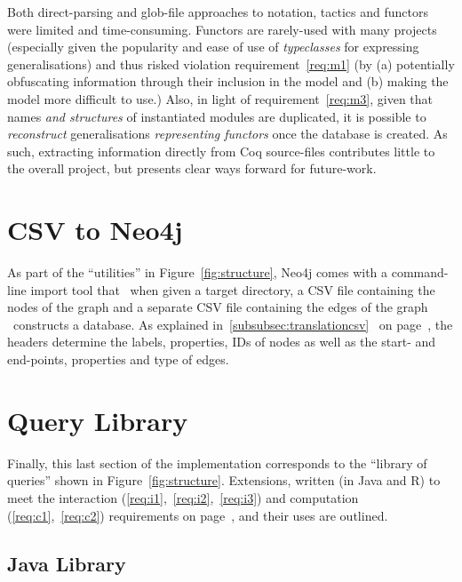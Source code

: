 Both direct-parsing and glob-file approaches to notation, tactics and functors
were limited and time-consuming. Functors are rarely-used with many projects
(especially given the popularity and ease of use of \emph{typeclasses} for
expressing generalisations) and thus risked violation requirement~\ref{req:m1}
(by (a) potentially obfuscating information through their inclusion in the model
and (b) making the model more difficult to use.) Also, in light of
requirement~\ref{req:m3}, given that names \emph{and structures} of instantiated
modules are duplicated, it is possible to \emph{reconstruct} generalisations
\emph{representing functors} once the database is created. As such, extracting
information directly from Coq source-files contributes little to the overall
project, but presents clear ways forward for future-work.

\section{CSV to Neo4j}

As part of the ``utilities'' in Figure~\ref{fig:structure}, Neo4j comes with a
command-line import tool that \textendash~when given a target directory, a CSV
file containing the nodes of the graph and a separate CSV file containing the
edges of the graph \textendash~constructs a database.  As explained
in~\ref{subsubsec:translationcsv}~ on
page~\pageref{subsubsec:translationcsv}, the headers determine the labels,
properties, IDs of nodes as well as the start- and end-points, properties and
type of edges.


\section{Query Library}

Finally, this last section of the implementation corresponds to the ``library of
queries'' shown in Figure~\ref{fig:structure}. Extensions, written (in Java and
R) to meet the interaction (\ref{req:i1},~\ref{req:i2},~\ref{req:i3}) and
computation (\ref{req:c1},~\ref{req:c2}) requirements on page~\pageref{req:i1},
and their uses are outlined.

\subsection{Java Library}

